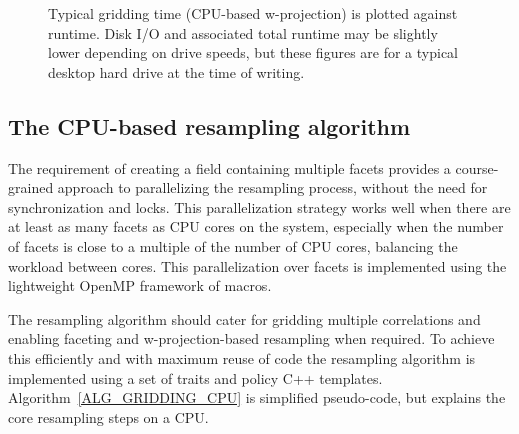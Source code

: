 \begin{figure}[ht!]
 \begin{mdframed}
 \centering
  \caption[Typical gridding time vs. runtime]{Typical gridding time (CPU-based w-projection) is plotted against runtime. 
	   Disk I/O and associated total runtime may be slightly lower depending on 
	   drive speeds, but these figures are for a typical desktop hard drive at the time
	   of writing.}
  \label{FIG_GRIDDING_VS_RUNTIME}
  \end{mdframed}
\end{figure}

\subsection{The CPU-based resampling algorithm}
The requirement of creating a field containing multiple facets provides a course-grained approach to parallelizing the resampling process,
without the need for synchronization and locks. This parallelization strategy works well when there are at least as many facets as CPU cores 
on the system, especially when the number of facets is close to a multiple of the number of CPU cores, balancing the workload between cores. This
parallelization over facets is implemented using the lightweight OpenMP framework of macros.

The resampling algorithm should cater for gridding multiple correlations and enabling faceting and w-projection-based resampling when required.
To achieve this efficiently and with maximum reuse of code the resampling algorithm is implemented using a set of traits and policy C++ templates.
Algorithm~\ref{ALG_GRIDDING_CPU} is simplified pseudo-code, but explains the core resampling steps on a CPU.

